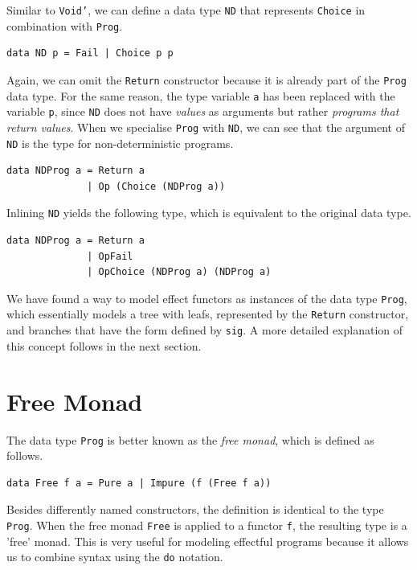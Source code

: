 \documentclass[a4paper, 11pt, fleqn, twoside]{scrreprt}
\newcommand{\todo}[1]{\marginpar{\textbf{TODO:} #1}}
\newcommand{\hinl}[1]{\texttt{#1}}
\newcommand{\cinl}[1]{\texttt{#1}}
\begin{document}
Similar to \hinl{Void'}, we can define a data type \hinl{ND} that represents \hinl{Choice} in combination with \hinl{Prog}.

\label{min:ND}
\begin{verbatim}
data ND p = Fail | Choice p p
\end{verbatim}

Again, we can omit the \hinl{Return} constructor because it is  already part of the \hinl{Prog} data type.
For the same reason,  the type variable \hinl{a} has been replaced with the variable \hinl{p}, since \hinl{ND} does not have \textit{values} as arguments but rather \textit{programs that return values}.
When we specialise \hinl{Prog} with \hinl{ND}, we can see that the argument of \hinl{ND} is the type for non-deterministic programs.

\begin{verbatim}
data NDProg a = Return a
              | Op (Choice (NDProg a))
\end{verbatim}

Inlining \hinl{ND} yields the following type, which is equivalent to the original data type.

\begin{verbatim}
data NDProg a = Return a
              | OpFail
              | OpChoice (NDProg a) (NDProg a)
\end{verbatim}

We have found a way to model effect functors as instances of the data type \hinl{Prog}, which essentially models a tree with leafs, represented by the \hinl{Return} constructor, and branches that have the form defined by \hinl{sig}.
\todo{Tree structure visualization}
A more detailed explanation of this concept follows in the next section.

\section{Free Monad}

The data type \hinl{Prog} is better known as the \textit{free monad}, which is defined as follows.

\begin{verbatim}
data Free f a = Pure a | Impure (f (Free f a))
\end{verbatim}

Besides differently named constructors, the definition is identical to the type \cinl{Prog}.
When the free monad \cinl{Free} is applied to a functor \cinl{f}, the resulting type is a 'free' monad.
This is very useful for modeling effectful programs because it allows us to combine syntax using the \hinl{do} notation.
\end{document}
